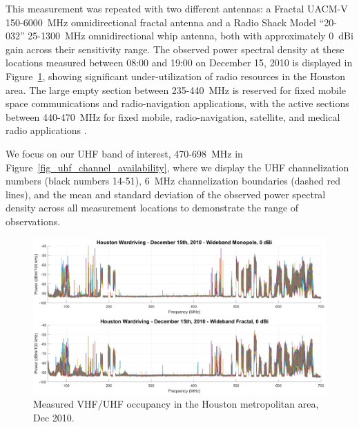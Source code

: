 	This measurement was repeated with two different antennas: a Fractal UACM-V 150-6000~MHz omnidirectional fractal antenna and a Radio Shack Model ``20-032'' 25-1300~MHz omnidirectional whip antenna, both with approximately 0~dBi gain across their sensitivity range.
	The observed power spectral density at these locations measured between 08:00 and 19:00 on December 15, 2010 is displayed in Figure~\ref{fig_all_spectrum_occupancy}, showing significant under-utilization of radio resources in the Houston area.
	The large empty section between 235-440~MHz is reserved for fixed mobile space communications and radio-navigation applications, with the active sections between 440-470~MHz for fixed mobile, radio-navigation, satellite, and medical radio applications \cite{fcc2018spectrumtable}.
	
	We focus on our UHF band of interest, 470-698~MHz in Figure~\ref{fig_uhf_channel_availability}, where we display the UHF channelization numbers (black numbers 14-51), 6~MHz channelization boundaries (dashed red lines), and the mean and standard deviation of the observed power spectral density across all measurement locations to demonstrate the range of observations.
	
\begin{figure}[ht!]
\centering
  	\includegraphics[width=1\linewidth]{figs/wardrive/Houston_Wardriving_12_17_2010_v2}   
   	\caption{Measured VHF/UHF occupancy in the Houston metropolitan area, Dec 2010.
	\label{fig_all_spectrum_occupancy}}
\end{figure}

